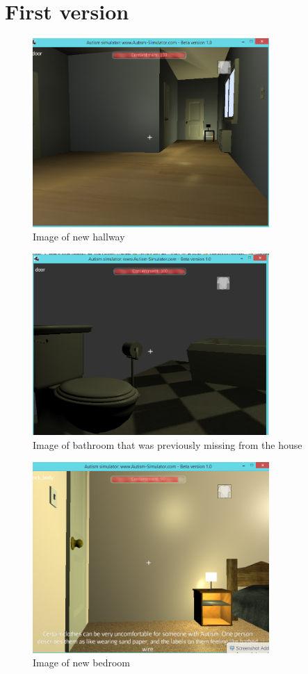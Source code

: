 \chapter{First version}

\begin{figure}[H]
\centering
\includegraphics[width=90mm]{images/implementationfirst/gameimages/new_hallway2.png}
\caption{Image of new hallway}
\label{newhallway2}
\end{figure}

\begin{figure}[H]
\centering
\includegraphics[width=90mm]{images/implementationfirst/gameimages/bathroom1.png}
\caption{Image of bathroom that was previously missing from the house}
\label{old_house}
\end{figure}

\begin{figure}[H]
\centering
\includegraphics[width=90mm]{images/implementationfirst/gameimages/bedroom_1.png}
\caption{Image of new bedroom}
\label{old_house}
\end{figure}

